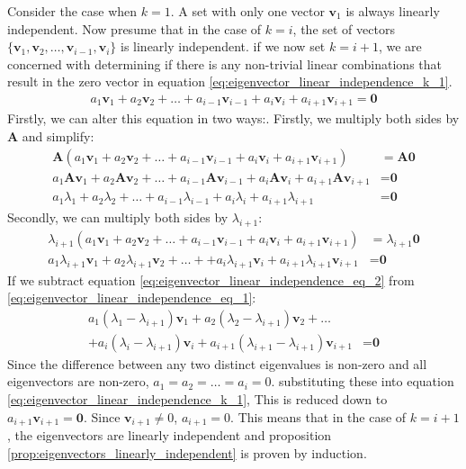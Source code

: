 \documentclass[a4paper,12pt]{book}
\newcommand{\matrx}[1]{\bm{#1}}
\newcommand{\vectr}[1]{\textbf{#1}}
\begin{document}
	Consider the case when $ k = 1 $. A set with only one vector $ \vectr{v}_1 $ is always linearly independent. Now presume that in the case of $ k = i $, the set of vectors $ \{\vectr{v}_1,\vectr{v}_2,\ldots,\vectr{v}_{i - 1},\vectr{v}_i\} $ is linearly independent. if we now set $ k = i + 1 $, we are concerned with determining if there is any non-trivial linear combinations that result in the zero vector in equation \ref{eq:eigenvector_linear_independence_k_1}. 
	\begin{align}
		a_1 \vectr{v}_1 + a_2 \vectr{v}_2 + \ldots + a_{i - 1} \vectr{v}_{i - 1} + a_i \vectr{v}_i + a_{i + 1} \vectr{v}_{i + 1} = \vectr{0}
		\label{eq:eigenvector_linear_independence_k_1}
	\end{align}
	Firstly, we can alter this equation in two ways:. Firstly, we multiply both sides by $ \matrx{A} $ and simplify:
	\begin{align}
		\matrx{A}(a_1 \vectr{v}_1 + a_2 \vectr{v}_2 + \ldots + a_{i - 1} \vectr{v}_{i - 1} + a_i \vectr{v}_i + a_{i + 1} \vectr{v}_{i + 1}) &= \matrx{A}\vectr{0} \nonumber \\
		a_1 \matrx{A}\vectr{v}_1 + a_2 \matrx{A}\vectr{v}_2 + \ldots + a_{i - 1} \matrx{A}\vectr{v}_{i - 1} + a_i \matrx{A}\vectr{v}_i + a_{i + 1} \matrx{A}\vectr{v}_{i + 1} &= \vectr{0} \nonumber \\
		\label{eq:eigenvector_linear_independence_eq_1} a_1 \lambda_1 + a_2 \lambda_2 + \ldots + a_{i - 1} \lambda_{i - 1} + a_i \lambda_i + a_{i + 1} \lambda_{i + 1} &= \vectr{0} 
	\end{align}
	Secondly, we can multiply both sides by $ \lambda_{i + 1} $:
	\begin{align}
		\lambda_{i + 1}(a_1 \vectr{v}_1 + a_2 \vectr{v}_2 + \ldots + a_{i - 1} \vectr{v}_{i - 1} + a_i \vectr{v}_i + a_{i + 1} \vectr{v}_{i + 1}) &= \lambda_{i + 1}\vectr{0} \nonumber \\
		\label{eq:eigenvector_linear_independence_eq_2} a_1\lambda_{i + 1} \vectr{v}_1 + a_2\lambda_{i + 1} \vectr{v}_2 + \ldots +  + a_i\lambda_{i + 1} \vectr{v}_i + a_{i + 1}\lambda_{i + 1} \vectr{v}_{i + 1} &= \vectr{0}
	\end{align}
	If we subtract equation \ref{eq:eigenvector_linear_independence_eq_2} from \ref{eq:eigenvector_linear_independence_eq_1}:
	\begin{align}
		a_1 (\lambda_1 - \lambda_{i + 1}) \vectr{v}_1 + a_2 (\lambda_2 - \lambda_{i + 1}) \vectr{v}_2 + \ldots \nonumber \\+ a_i (\lambda_i - \lambda_{i + 1}) \vectr{v}_i + a_{i + 1} (\lambda_{i + 1} - \lambda_{i + 1}) \vectr{v}_{i + 1} &= \vectr{0} 
	\end{align}
	Since the difference between any two distinct eigenvalues is non-zero and all eigenvectors are non-zero, $ a_1 = a_2 = \ldots = a_i = 0 $. substituting these into equation \ref{eq:eigenvector_linear_independence_k_1}, This is reduced down to $ a_{i + 1}\vectr{v}_{i + 1} = \vectr{0}$. Since $ \vectr{v}_{i + 1} \ne 0 $,  $ a_{i + 1} = 0 $. This means that in the case of $ k = i + 1 $, the eigenvectors are linearly independent and proposition \ref{prop:eigenvectors_linearly_independent} is proven by induction.
	
\end{document}
